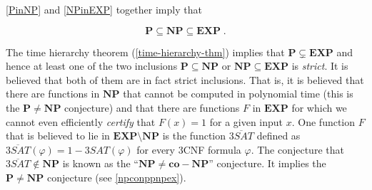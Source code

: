 \hypertarget{NPinEXP}{}


\cref{PinNP} and \cref{NPinEXP} together imply that

\[\mathbf{P} \subseteq \mathbf{NP} \subseteq \mathbf{EXP}\;.\]

The time hierarchy theorem (\cref{time-hierarchy-thm}) implies that
\(\mathbf{P} \subsetneq \mathbf{EXP}\) and hence at least one of the two
inclusions \(\mathbf{P} \subseteq \mathbf{NP}\) or
\(\mathbf{NP} \subseteq \mathbf{EXP}\) is \emph{strict}. It is believed
that both of them are in fact strict inclusions. That is, it is believed
that there are functions in \(\mathbf{NP}\) that cannot be computed in
polynomial time (this is the \(\mathbf{P} \neq \mathbf{NP}\) conjecture)
and that there are functions \(F\) in \(\mathbf{EXP}\) for which we
cannot even efficiently \emph{certify} that \(F(x)=1\) for a given input
\(x\). One function \(F\) that is believed to lie in
\(\mathbf{EXP} \setminus \mathbf{NP}\) is the function
\(\overline{3\ensuremath{\mathit{SAT}}}\) defined as
\(\overline{3\ensuremath{\mathit{SAT}}}(\varphi)= 1 - 3\ensuremath{\mathit{SAT}}(\varphi)\)
for every 3CNF formula \(\varphi\). The conjecture that
\(\overline{3\ensuremath{\mathit{SAT}}}\not\in \mathbf{NP}\) is known as
the ``\(\mathbf{NP} \neq \mathbf{co-NP}\)'' conjecture. It implies the
\(\mathbf{P} \neq \mathbf{NP}\) conjecture (see \cref{npconppnpex}).

